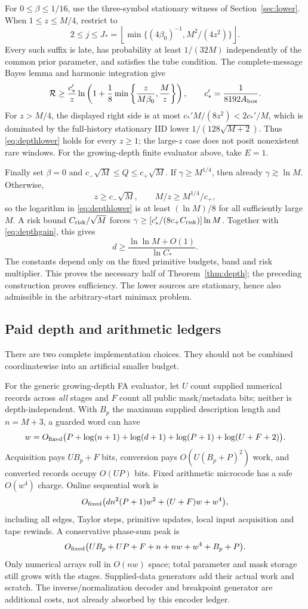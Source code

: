 \documentclass[11pt,letterpaper]{article}
\theoremstyle{definition}\newtheorem{definition}[theorem]{Definition}
\theoremstyle{remark}\newtheorem{remark}[theorem]{Remark}
\newcommand{\floor}[1]{\left\lfloor #1\right\rfloor}
\newcommand{\Risk}{\mathcal{R}}
\begin{document}
For $0\le\beta\le1/16$, use the three-symbol stationary witness of Section~\ref{sec:lower}. When $1\le z\le M/4$, restrict to
\[
 2\le j\le J_*=\floor{\min\{(4\beta_0)^{-1},M^2/(4z^2)\}}.
\]
Every such suffix is late, has probability at least $1/(32M)$ independently of the common prior parameter, and satisfies the tube condition. The complete-message Bayes lemma and harmonic integration give
\begin{equation}\label{eq:depthlower}
 \Risk\ge\frac{c_*'}z
 \ln\left(1+\frac18\min\left\{\frac{z}{M\beta_0},\frac Mz\right\}\right),
 \qquad c_*'=\frac1{8192A_{\rm box}}.
\end{equation}
For $z>M/4$, the displayed right side is at most
$c_*'M/(8z^2)<2c_*'/M$, which is dominated by the full-history stationary IID lower $1/(128\sqrt{M+2})$. Thus \eqref{eq:depthlower} holds for every $z\ge1$; the large-$z$ case does not posit nonexistent rare windows. For the growing-depth finite evaluator above, take $E=1$.

Finally set $\beta=0$ and $c_-\sqrt M\le Q\le c_+\sqrt M$. If $\gamma\ge M^{1/4}$, then already $\gamma\gtrsim\ln M$. Otherwise,
\[
 z\ge c_-\sqrt M,\qquad M/z\ge M^{1/4}/c_+,
\]
so the logarithm in \eqref{eq:depthlower} is at least $(\ln M)/8$ for all sufficiently large $M$. A risk bound $C_{\rm risk}/\sqrt M$ forces
$\gamma\ge[c_*'/(8c_+C_{\rm risk})]\ln M$.
Together with \eqref{eq:depthgain}, this gives
\[
 d\ge\frac{\ln\ln M+O(1)}{\ln C_*}.
\]
The constants depend only on the fixed primitive budgets, band and risk multiplier. This proves the necessary half of Theorem~\ref{thm:depth}; the preceding construction proves sufficiency. The lower sources are stationary, hence also admissible in the arbitrary-start minimax problem.

\subsection{Paid depth and arithmetic ledgers}\label{sec:depthcost}
There are two complete implementation choices. They should not be combined coordinatewise into an artificial smaller budget.

For the generic growing-depth FA evaluator, let $U$ count supplied numerical records across \emph{all} stages and $F$ count all public mask/metadata bits; neither is depth-independent. With $B_p$ the maximum supplied description length and $n=M+3$, a guarded word can have
\[
 w=O_{\rm fixed}\bigl(P+\log(n+1)+\log(d+1)+\log(P+1)+\log(U+F+2)\bigr).
\]
Acquisition pays $UB_p+F$ bits, conversion pays $O(U(B_p+P)^2)$ work, and converted records occupy $O(UP)$ bits. Fixed arithmetic microcode has a safe $O(w^4)$ charge. Online sequential work is
\[
 O_{\rm fixed}\bigl(dn^2(P+1)w^2+(U+F)w+w^4\bigr),
\]
including all edges, Taylor steps, primitive updates, local input acquisition and tape rewinds. A conservative phase-sum peak is
\[
 O_{\rm fixed}\bigl(UB_p+UP+F+n+nw+w^4+B_p+P\bigr).
\]
Only numerical arrays roll in $O(nw)$ space; total parameter and mask storage still grows with the stages. Supplied-data generators add their actual work and scratch. The inverse/normalization decoder and breakpoint generator are additional costs, not already absorbed by this encoder ledger.
\end{document}

